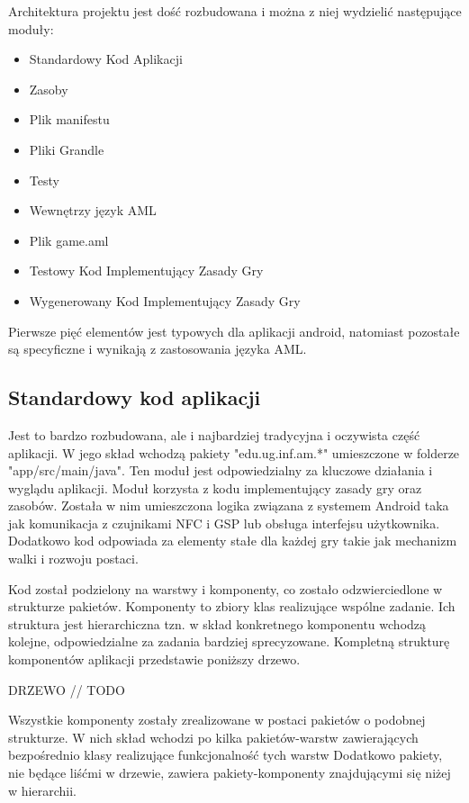 \documentclass	{xmgr}
\begin{document}
Architektura projektu jest dość rozbudowana i można z niej wydzielić następujące moduły:

\begin{itemize}
	\item Standardowy Kod Aplikacji
	\item Zasoby
	\item Plik manifestu
	\item Pliki Grandle
	\item Testy
	\item Wewnętrzy język AML
	\item Plik game.aml
	\item Testowy Kod Implementujący Zasady Gry
	\item Wygenerowany Kod Implementujący Zasady Gry
\end{itemize}

Pierwsze pięć elementów jest typowych dla aplikacji android, natomiast pozostałe są specyficzne i wynikają z zastosowania języka AML.

\subsection{Standardowy kod aplikacji} 

Jest to bardzo rozbudowana, ale i najbardziej tradycyjna i oczywista część aplikacji. W jego skład wchodzą pakiety "edu.ug.inf.am.*" umieszczone w folderze "app/src/main/java". Ten moduł jest odpowiedzialny za kluczowe działania i wyglądu aplikacji. Moduł korzysta z kodu implementujący zasady gry oraz zasobów. Została w nim umieszczona logika związana z systemem Android taka jak komunikacja z czujnikami NFC i GSP lub obsługa interfejsu użytkownika. Dodatkowo kod odpowiada za elementy stałe dla każdej gry takie jak mechanizm walki i rozwoju postaci.

Kod został podzielony na warstwy i komponenty, co zostało odzwierciedlone w strukturze pakietów. 
Komponenty to zbiory klas realizujące wspólne zadanie. Ich struktura jest hierarchiczna tzn. w skład konkretnego komponentu wchodzą kolejne, odpowiedzialne za zadania bardziej sprecyzowane. Kompletną strukturę komponentów aplikacji przedstawie poniższy drzewo.

DRZEWO // TODO

Wszystkie komponenty zostały zrealizowane w postaci pakietów o podobnej strukturze. W nich skład wchodzi po kilka pakietów-warstw zawierających bezpośrednio klasy realizujące funkcjonalność tych warstw Dodatkowo pakiety, nie będące liśćmi w drzewie, zawiera pakiety-komponenty znajdującymi się niżej w hierarchii.
\end{document}
